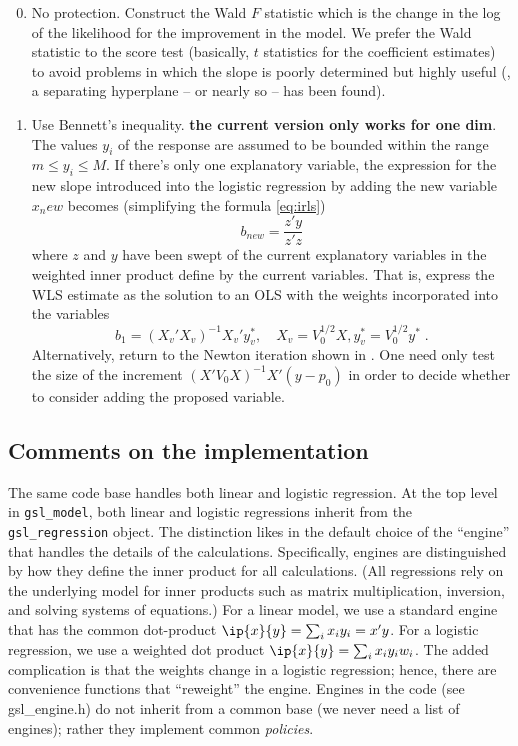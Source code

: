 \documentclass[12pt]{article}
\begin{document}
\begin{enumerate}
\setcounter{enumi}{-1}

\item No protection.  Construct the Wald $F$ statistic which is the
 change in the log of the likelihood for the improvement in the model.
  We prefer the Wald statistic to the score test (basically, $t$
 statistics for the coefficient estimates) to avoid problems in which
 the slope is poorly determined but highly useful (\eg, a separating
 hyperplane -- or nearly so -- has been found).

\item Use Bennett's inequality.  {\bf the current version only works
 for one dim}.  The values $y_i$ of the response are assumed to be
 bounded within the range $m \le y_i \le M$.  If there's only one
 explanatory variable, the expression for the new slope introduced
 into the logistic regression by adding the new variable $x_new$
 becomes (simplifying the formula \ref{eq:irls})
\begin{displaymath}
  b_{new} = \frac{z'y}{z'z}
\end{displaymath}
 where $z$ and $y$ have been swept of the current explanatory variables in the
 weighted inner product define by the current variables.  That is, express the
WLS  estimate as the solution to an OLS with the weights
incorporated into the variables 
\begin{equation}
  b_1 = (X_v'X_v)^{-1}X_v'y^{*}_{v}, 
    \quad X_v = V_0^{1/2}X, y^{*}_v = V_0^{1/2}y^{*} \;.
\label{eq:wls}
\end{equation}
 Alternatively, return to the Newton iteration shown in .  One
 need only test the size of the increment $(X'V_0X)^{-1}X'(y-p_0)$ in order to
 decide whether to consider adding the proposed variable.

\end{enumerate}

\subsection{Comments on the implementation}

 The same code base handles both linear and logistic regression.  At the top
 level in {\tt gsl\_model}, both linear and logistic regressions inherit from the
 {\tt gsl\_regression} object.  The distinction likes in the default choice of
 the ``engine'' that handles the details of the calculations.  Specifically,
 engines are distinguished by how they define the inner product for all
 calculations. (All regressions rely on the underlying model for inner products
 such as matrix multiplication, inversion, and solving systems of equations.)
  For a linear model, we use a standard engine that has the common dot-product
 $\ip{x}{y} = \sum_i x_i y_i = x'y$.  For a logistic regression, we use a
 weighted dot product $\ip{x}{y} = \sum_i x_i y_i w_i$.  The added complication
 is that the weights change in a logistic regression; hence, there are
 convenience functions that ``reweight'' the engine.  Engines in the code (see
 gsl\_engine.h) do not inherit from a common base (we never need a list of
 engines); rather they implement common {\em policies}.  
\end{document}
